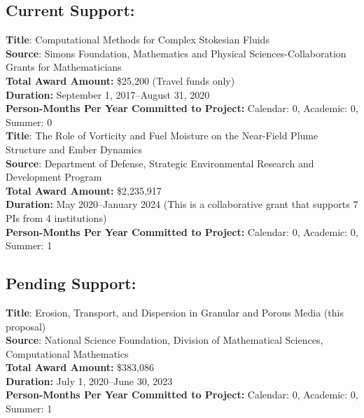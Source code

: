 \documentclass[11pt]{article}
\begin{document}
\subsection*{Current Support:}
{\bf Title}: Computational Methods for Complex Stokesian Fluids \\
{\bf Source}: Simons Foundation, Mathematics and Physical
Sciences-Collaboration Grants for Mathematicians \\
{\bf Total Award Amount:} \$25,200 (Travel funds only) \\
{\bf Duration:} September 1, 2017--August 31, 2020 \\
{\bf Person-Months Per Year Committed to Project:} Calendar: 0,
Academic: 0, Summer: 0 \\

\noindent
{\bf Title}: The Role of Vorticity and Fuel Moisture on the Near-Field
Plume Structure and Ember Dynamics \\
{\bf Source}: Department of Defense, Strategic Environmental Research
and Development Program \\
{\bf Total Award Amount:} \$2,235,917 \\
{\bf Duration:} May 2020--January 2024 (This is a collaborative grant
that supports 7 PIs from 4 institutions) \\
{\bf Person-Months Per Year Committed to Project:} Calendar: 0,
Academic: 0, Summer: 1 \\


\vspace{-17pt}
\subsection*{Pending Support:}
{\bf Title}: Erosion, Transport, and Dispersion in Granular and Porous
Media (this proposal) \\
{\bf Source}: National Science Foundation, Division of Mathematical
Sciences, Computational Mathematics \\
{\bf Total Award Amount:} \$383,086 \\
{\bf Duration:} July 1, 2020--June 30, 2023 \\
{\bf Person-Months Per Year Committed to Project:} Calendar: 0,
Academic: 0, Summer: 1 \\
\end{document}
